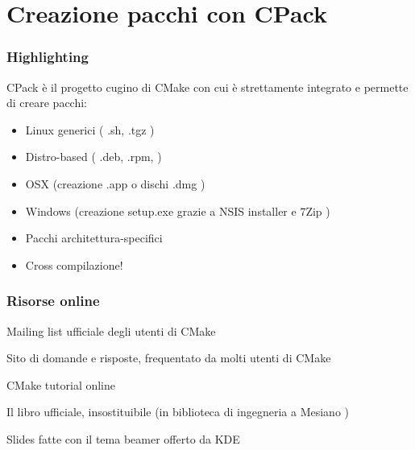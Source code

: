 \documentclass[12pt] {beamer}
\begin{document}
\section{Creazione pacchi con CPack}
\begin{frame}
\frametitle{Highlighting}
CPack è il progetto cugino di CMake con cui è strettamente integrato e permette di creare pacchi:
\begin{itemize}
\item Linux generici ( .sh, .tgz )
\item Distro-based ( .deb, .rpm, )
\item OSX (creazione .app o dischi .dmg )
\item Windows (creazione setup.exe grazie a NSIS installer e 7Zip )
\end{itemize}
\begin{itemize}
\item Pacchi architettura-specifici
\item Cross compilazione!
\end{itemize}

\end{frame}


\newcommand{\putlink} [1]{%
                          \pgfsetlinewidth{1.4pt}%
                          \pgfsetendarrow{\pgfarrowtriangle{4pt}}%
\pgfline{\pgfxy(1,1)}{\pgfxy(#1,1)}
                         }

\begin{frame}
\frametitle{Risorse online}
\begin{thebibliography}{10}

\beamertemplatearticlebibitems

Mailing list ufficiale degli utenti di CMake

               Sito di domande e risposte, frequentato da molti utenti di CMake

               CMake tutorial online

                              Il libro ufficiale, insostituibile (in biblioteca di ingegneria a Mesiano )

                                        Slides fatte con il tema beamer offerto da KDE

                                                \end{thebibliography}
                                                \end{frame}

\end{document}
